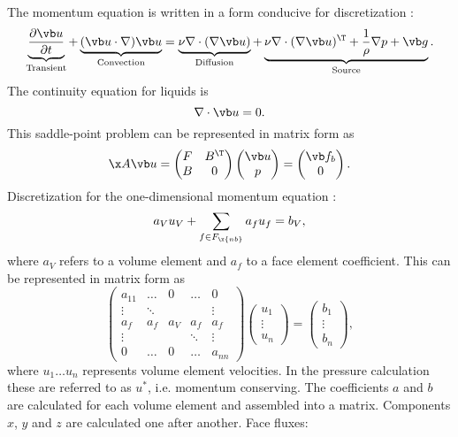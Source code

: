 \documentclass[12pt]{article}
\newcommand{\fnb}{F_{\x{nb}}}
\begin{document}
The momentum equation is written in a form conducive for discretization \cite{mou}:
$$
  \underbrace{\frac{\partial \vb u}{\partial t}}_\text{Transient} + \underbrace{(\vb u \cdot \nabla) \vb u}_\text{Convection} = \underbrace{\nu \nabla \cdot (\nabla \vb u)}_\text{Diffusion} + \underbrace{\nu \nabla \cdot (\nabla \vb u)^\T + \frac{1}{\rho} \nabla p + \vb g}_\text{Source}.
$$
The continuity equation for liquids is
$$
\nabla \cdot \vb u = 0.
$$
This saddle-point problem can be represented in matrix form as \cite{mou}
$$
\x A \vb u = \begin{pmatrix}
  F & B^\T \\
  B & 0
\end{pmatrix}
\begin{pmatrix}
  \vb u \\
  p
\end{pmatrix} =
\begin{pmatrix}
  \vb f_b \\
  0
\end{pmatrix}.
$$
Discretization for the one-dimensional momentum equation \cite{mou}:
\begin{equation}
  a_V u_V + \sum_{f \in \fnb} a_f u_f = b_V,
\end{equation}
where $a_V$ refers to a volume element and $a_f$ to a face element coefficient. This can be represented in matrix form as
$$
\begin{pmatrix}
  a_{11} & \dots & 0 & \dots & 0 \\
  \vdots & \ddots & &  & \vdots \\
  a_f & a_f & a_V & a_f & a_f \\
  \vdots & &  & \ddots & \vdots \\
  0 & \dots & 0 & \dots & a_{nn}
\end{pmatrix}
\begin{pmatrix}
  u_1 \\
  \vdots \\
  u_n
\end{pmatrix} =
\begin{pmatrix}
  b_{1} \\
  \vdots \\
  b_n
\end{pmatrix},
$$
where $u_1 \dots u_n$ represents volume element velocities. In the pressure calculation these are referred to as $u^*$, i.e. momentum conserving. The coefficients $a$ and $b$ are calculated for each volume element and assembled into a matrix. Components $x$, $y$ and $z$ are calculated one after another.
Face fluxes:
\end{document}
